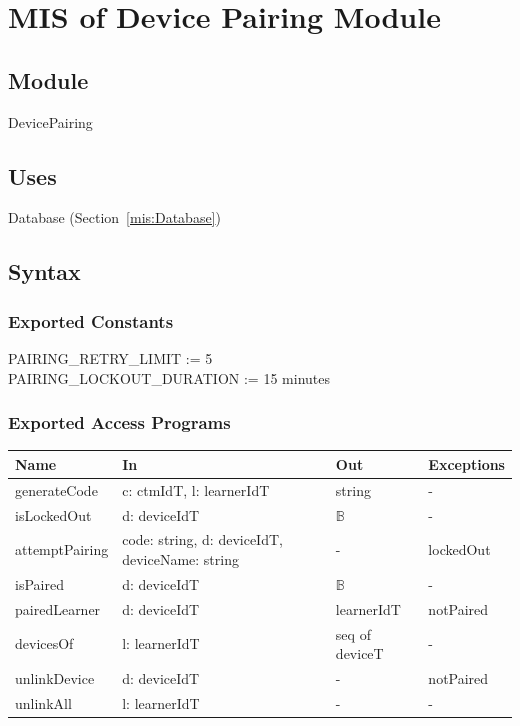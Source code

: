 \documentclass[12pt, titlepage]{article}
\newcommand{\Mref}[1]{Section~\ref{#1}}
\begin{document}
\newpage

\section{MIS of Device Pairing Module} \label{mis:DevicePairing}

\subsection{Module}

DevicePairing

\subsection{Uses}

Database (\Mref{mis:Database})

\subsection{Syntax}

\subsubsection{Exported Constants}

PAIRING\_RETRY\_LIMIT := 5 \\
PAIRING\_LOCKOUT\_DURATION := 15 minutes

\subsubsection{Exported Access Programs}

\begin{center}
\small
\begin{tabular}{p{3.3cm} p{4.7cm} p{2.6cm} p{2.8cm}}
\hline
\textbf{Name} & \textbf{In} & \textbf{Out} & \textbf{Exceptions} \\
\hline
generateCode & c: ctmIdT, l: learnerIdT & string & - \\
isLockedOut & d: deviceIdT & $\mathbb{B}$ & - \\
attemptPairing & code: string, d: deviceIdT, deviceName: string & - & lockedOut \\
isPaired & d: deviceIdT & $\mathbb{B}$ & - \\
pairedLearner & d: deviceIdT & learnerIdT & notPaired \\
devicesOf & l: learnerIdT & seq of deviceT & - \\
unlinkDevice & d: deviceIdT & - & notPaired \\
unlinkAll & l: learnerIdT & - & - \\
\hline
\end{tabular}
\end{center}
\end{document}
